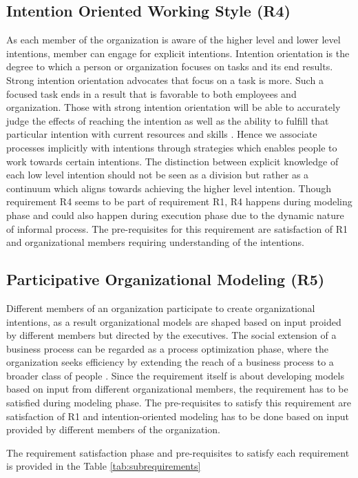 \subsection{Intention Oriented Working Style (R4)}
As each member of the organization is aware of the higher level and lower level intentions, member can engage for explicit intentions. Intention orientation is the degree to which a person or organization focuses on tasks and its end results. Strong intention orientation advocates that focus on a task is more. Such a focused task ends in a result that is favorable to both employees and organization. Those with strong intention orientation will be able to accurately judge the effects of reaching the intention as well as the ability to fulfill that particular intention with current resources and skills \cite{Lacom}. Hence we associate processes implicitly with intentions through strategies which enables people to work towards certain intentions. The distinction between explicit knowledge of each low level intention should not be seen as a division but rather as a continuum which aligns towards achieving the higher level intention. Though requirement R4 seems to be part of requirement R1, R4 happens during modeling phase and could also happen during execution phase due to the dynamic nature of informal process. The pre-requisites for this requirement are satisfaction of R1 and organizational members requiring understanding of the intentions.  

\subsection{Participative Organizational Modeling (R5)}
 Different members of an organization participate to create organizational intentions, as a result organizational models are shaped based on input proided by different members but directed by the executives. The social extension of a business process can be regarded as a process optimization phase, where the organization seeks efficiency by extending the reach of a business process to a broader class of people \cite{Brambilla2012}. Since the requirement itself is about developing models based on input from different organizational members, the requirement has to be satisfied during modeling phase. The pre-requisites to satisfy this requirement are satisfaction of R1 and intention-oriented modeling has to be done based on input provided by different members of the organization.  
 
 The requirement satisfaction phase and pre-requisites to satisfy each requirement is provided in the Table \ref{tab:subrequirements}

